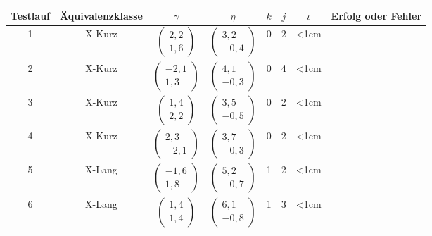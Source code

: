 \begin{center}
	\begin{longtable}{|c|c|c|c|c|c|c|c|}
		\hline
		Testlauf & Äquivalenzklasse &$\gamma$ & $\eta$ & $k$ & $j$ & $\iota$ & Erfolg oder Fehler\\
		\hline
		\hline
		1 & X-Kurz & $\left(\begin{array}{c} 2,2 \\ 1,6\end{array}\right)$ & $\left(\begin{array}{c} 3,2 \\ -0,4\end{array}\right)$ & $0$ & $2$ & <1cm& \checkmark\\
		\hline
		2 & X-Kurz &  $\left(\begin{array}{c} -2,1 \\ 1,3\end{array}\right)$ & $\left(\begin{array}{c} 4,1 \\ -0,3\end{array}\right)$ & 0 & 4 & <1cm & \checkmark\\
		\hline
		3 & X-Kurz &  $\left(\begin{array}{c} 1,4 \\ 2,2\end{array}\right)$ & $\left(\begin{array}{c} 3,5 \\ -0,5\end{array}\right)$ & 0 & 2& <1cm& \checkmark\\
		\hline
		4 & X-Kurz &  $\left(\begin{array}{c} 2,3 \\ -2,1\end{array}\right)$ & $\left(\begin{array}{c} 3,7 \\ -0,3\end{array}\right)$ & 0& 2&<1cm & \checkmark\\
		\hline
		5 & X-Lang &  $\left(\begin{array}{c} -1,6 \\ 1,8\end{array}\right)$ & $\left(\begin{array}{c} 5,2 \\ -0,7\end{array}\right)$ & 1& 2& <1cm& \checkmark\\
		\hline
		6 & X-Lang &  $\left(\begin{array}{c} 1,4 \\ 1,4\end{array}\right)$ & $\left(\begin{array}{c} 6,1 \\ -0,8\end{array}\right)$ & 1& 3& <1cm& \checkmark\\

\end{longtable}
\end{center}
